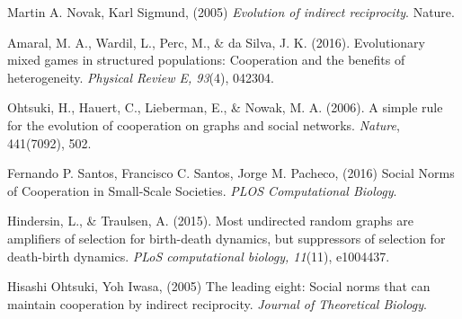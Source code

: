 \documentclass[10pt,a4paper]{article}
\begin{document}
\begin{thebibliography}{9}
Martin A. Novak, Karl Sigmund, (2005) 
\textit{Evolution of indirect reciprocity}. 
Nature.

\bibitem{}
Amaral, M. A., Wardil, L., Perc, M., \& da Silva, J. K. (2016). Evolutionary mixed games in structured populations: Cooperation and the benefits of heterogeneity. 
\textit{Physical Review E, 93}(4), 042304.

Ohtsuki, H., Hauert, C., Lieberman, E., \& Nowak, M. A. (2006). A simple rule for the evolution of cooperation on graphs and social networks. \textit{Nature}, 441(7092), 502.

Fernando P. Santos, Francisco C. Santos, Jorge M. Pacheco, (2016) 
Social Norms of Cooperation in Small-Scale Societies.
\textit{PLOS Computational Biology}.

Hindersin, L., \& Traulsen, A. (2015). Most undirected random graphs are amplifiers of selection for birth-death dynamics, but suppressors of selection for death-birth dynamics.
\textit{PLoS computational biology, 11}(11), e1004437.

Hisashi Ohtsuki, Yoh Iwasa, (2005) 
The leading eight: Social norms that can maintain cooperation by indirect reciprocity.
\textit{Journal of Theoretical Biology}.


\end{thebibliography}
\end{document}
